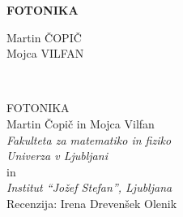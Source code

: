 \documentclass[11pt,fleqn]{book} %
\begin{document}
\let\cleardoublepage\clearpage
\makeatletter
\setlength{\@fptop}{0pt}
\makeatother




\begingroup
\thispagestyle{empty}
\centering
\vspace*{5cm}
\par\normalfont\fontsize{35}{35}\sffamily\selectfont
\textbf{FOTONIKA}\\
{\LARGE }\par %
\vspace*{1cm}
\vspace*{1cm}
\vspace*{8cm}
{\Large Martin ČOPIČ \\Mojca VILFAN \\}\par %
\endgroup


\newpage
~\vfill
\thispagestyle{empty}

FOTONIKA \\

Martin Čopič in Mojca Vilfan\\
{\it Fakulteta za matematiko in fiziko\\
Univerza v Ljubljani}\\
in\\
{\it Institut ``Jožef Stefan'', Ljubljana}\\
 
Recenzija: Irena Drevenšek Olenik\\ %

\end{document}
